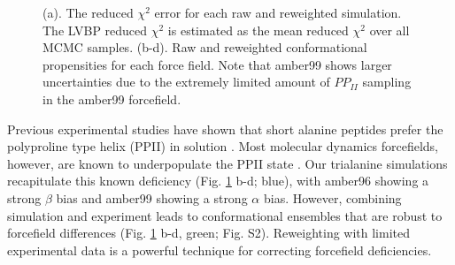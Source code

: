 \documentclass[journal=jacsat,manuscript=article]{achemso}
\begin{document}
\begin{figure}
\caption{
(a).  The reduced $\chi^2$ error for each raw and reweighted simulation.  The LVBP reduced $\chi^2$ is estimated as the mean reduced $\chi^2$ over all MCMC samples.  (b-d).  Raw and reweighted conformational propensities for each force field.  Note that amber99 shows larger uncertainties due to the extremely limited amount of $PP_{II}$ sampling in the amber99 forcefield.
}
\label{figure:ALA3}
\end{figure}


Previous experimental studies have shown that short alanine peptides prefer the polyproline type helix (PPII) in solution \cite{Grdadolnik2011, Graf2007, Avbelj2006}.  Most molecular dynamics forcefields, however, are known to underpopulate the PPII state \cite{Graf2007,beauchamp2012protein,Nerenberg2011, Best2008}.  Our trialanine simulations recapitulate this known deficiency (Fig. \ref{figure:ALA3} b-d; blue), with amber96 showing a strong $\beta$ bias and amber99 showing a strong $\alpha$ bias.  However, combining simulation and experiment leads to conformational ensembles that are robust to forcefield differences (Fig. \ref{figure:ALA3} b-d, green; Fig. S2).  Reweighting with limited experimental data is a powerful technique for correcting forcefield deficiencies.  
\end{document}
